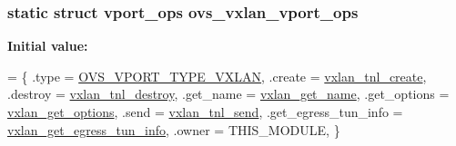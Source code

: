 \subsubsection[{ovs\+\_\+vxlan\+\_\+vport\+\_\+ops}]{\setlength{\rightskip}{0pt plus 5cm}static struct {\bf vport\+\_\+ops} ovs\+\_\+vxlan\+\_\+vport\+\_\+ops\hspace{0.3cm}{\ttfamily [static]}}\label{linux_2vport-vxlan_8c_a14100e1b742c7bb52f41541582330814}
{\bfseries Initial value\+:}
\begin{DoxyCode}
= \{
    .type           = \hyperlink{openvswitch_8h_a9a1b861aa99bd83177a2b10b34745b0aabd94b320598ca17b189318d8e27ac1b0}{OVS\_VPORT\_TYPE\_VXLAN},
    .create         = \hyperlink{linux_2vport-vxlan_8c_a15944f1b89ca72bfaf953d278bf09ca7}{vxlan\_tnl\_create},
    .destroy        = \hyperlink{linux_2vport-vxlan_8c_aade4bb74066fe5f4ab11820ab7c90485}{vxlan\_tnl\_destroy},
    .get\_name       = \hyperlink{linux_2vport-vxlan_8c_a8c4bc3ac94b12c027f1c2148fae55d61}{vxlan\_get\_name},
    .get\_options        = \hyperlink{linux_2vport-vxlan_8c_a50ef73121a1de8be6425c76ea97fc3da}{vxlan\_get\_options},
    .send           = \hyperlink{linux_2vport-vxlan_8c_a3f79b05ea9b700c041b3aff7361e707f}{vxlan\_tnl\_send},
    .get\_egress\_tun\_info    = \hyperlink{linux_2vport-vxlan_8c_a24930f1f6ecb4c221d189f13253a5feb}{vxlan\_get\_egress\_tun\_info},
    .owner          = THIS\_MODULE,
\}
\end{DoxyCode}
